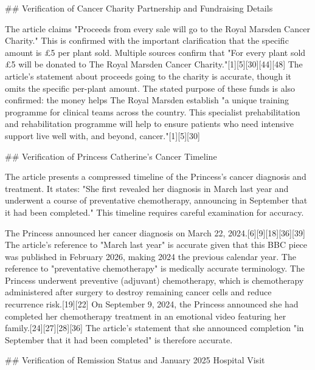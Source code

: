 \documentclass[10pt,a4paper]{article}
\begin{document}
\par\medskip
\#\# Verification of Cancer Charity Partnership and Fundraising Details
\par\medskip
The article claims "Proceeds from every sale will go to the Royal Marsden Cancer Charity." This is confirmed with the important clarification that the specific amount is £5 per plant sold. Multiple sources confirm that "For every plant sold £5 will be donated to The Royal Marsden Cancer Charity."[1][5][30][44][48] The article's statement about proceeds going to the charity is accurate, though it omits the specific per-plant amount. The stated purpose of these funds is also confirmed: the money helps The Royal Marsden establish "a unique training programme for clinical teams across the country. This specialist prehabilitation and rehabilitation programme will help to ensure patients who need intensive support live well with, and beyond, cancer."[1][5][30]
\par\medskip
\#\# Verification of Princess Catherine's Cancer Timeline
\par\medskip
The article presents a compressed timeline of the Princess's cancer diagnosis and treatment. It states: "She first revealed her diagnosis in March last year and underwent a course of preventative chemotherapy, announcing in September that it had been completed." This timeline requires careful examination for accuracy.
\par\medskip
The Princess announced her cancer diagnosis on March 22, 2024.[6][9][18][36][39] The article's reference to "March last year" is accurate given that this BBC piece was published in February 2026, making 2024 the previous calendar year. The reference to "preventative chemotherapy" is medically accurate terminology. The Princess underwent preventive (adjuvant) chemotherapy, which is chemotherapy administered after surgery to destroy remaining cancer cells and reduce recurrence risk.[19][22] On September 9, 2024, the Princess announced she had completed her chemotherapy treatment in an emotional video featuring her family.[24][27][28][36] The article's statement that she announced completion "in September that it had been completed" is therefore accurate.
\par\medskip
\#\# Verification of Remission Status and January 2025 Hospital Visit
\par\medskip
\end{document}
